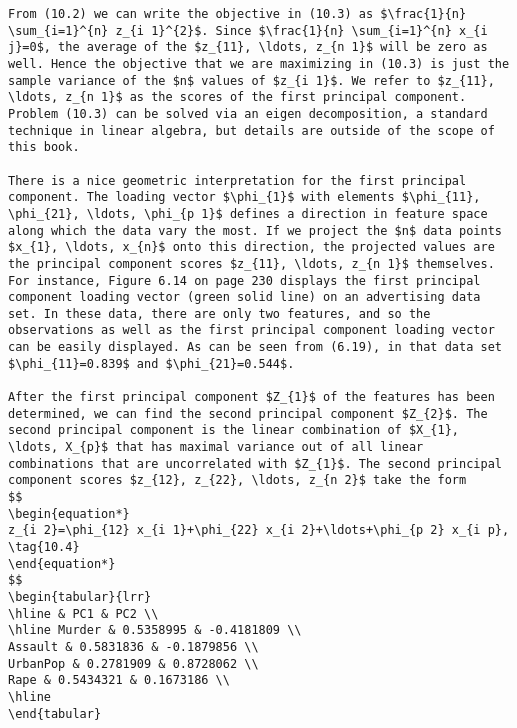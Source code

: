 \documentclass[10pt]{article}
\begin{document}
\begin{verbatim}
From (10.2) we can write the objective in (10.3) as $\frac{1}{n} \sum_{i=1}^{n} z_{i 1}^{2}$. Since $\frac{1}{n} \sum_{i=1}^{n} x_{i j}=0$, the average of the $z_{11}, \ldots, z_{n 1}$ will be zero as well. Hence the objective that we are maximizing in (10.3) is just the sample variance of the $n$ values of $z_{i 1}$. We refer to $z_{11}, \ldots, z_{n 1}$ as the scores of the first principal component. Problem (10.3) can be solved via an eigen decomposition, a standard technique in linear algebra, but details are outside of the scope of this book.

There is a nice geometric interpretation for the first principal component. The loading vector $\phi_{1}$ with elements $\phi_{11}, \phi_{21}, \ldots, \phi_{p 1}$ defines a direction in feature space along which the data vary the most. If we project the $n$ data points $x_{1}, \ldots, x_{n}$ onto this direction, the projected values are the principal component scores $z_{11}, \ldots, z_{n 1}$ themselves. For instance, Figure 6.14 on page 230 displays the first principal component loading vector (green solid line) on an advertising data set. In these data, there are only two features, and so the observations as well as the first principal component loading vector can be easily displayed. As can be seen from (6.19), in that data set $\phi_{11}=0.839$ and $\phi_{21}=0.544$.

After the first principal component $Z_{1}$ of the features has been determined, we can find the second principal component $Z_{2}$. The second principal component is the linear combination of $X_{1}, \ldots, X_{p}$ that has maximal variance out of all linear combinations that are uncorrelated with $Z_{1}$. The second principal component scores $z_{12}, z_{22}, \ldots, z_{n 2}$ take the form
$$
\begin{equation*}
z_{i 2}=\phi_{12} x_{i 1}+\phi_{22} x_{i 2}+\ldots+\phi_{p 2} x_{i p}, \tag{10.4}
\end{equation*}
$$
\begin{tabular}{lrr}
\hline & PC1 & PC2 \\
\hline Murder & 0.5358995 & -0.4181809 \\
Assault & 0.5831836 & -0.1879856 \\
UrbanPop & 0.2781909 & 0.8728062 \\
Rape & 0.5434321 & 0.1673186 \\
\hline
\end{tabular}


\end{verbatim}
\end{document}
